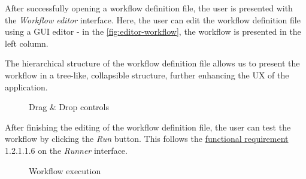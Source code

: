 After successfully opening a workflow definition file, the user is presented with the \textit{Workflow editor} interface. 
Here, the user can edit the workflow definition file using a \ac{GUI} editor - in the \autoref{fig:editor-workflow}, the workflow is presented in the left column.

The hierarchical structure of the workflow definition file allows us to present the workflow in a tree-like, collapsible structure, further enhancing the \ac{UX} of the application.

\begin{figure}[h!]
    \begin{center}
    \end{center}
    \caption{Drag \& Drop controls}
\end{figure}

After finishing the editing of the workflow definition file, the user can test the workflow by clicking the \textit{Run} button.
This follows the \hyperref[requirements]{functional requirement} 1.2.1.1.6 on the \textit{Runner} interface.

\begin{figure}[h!]
    \begin{center}
    \end{center}
    \caption{Workflow execution} \label{fig:editor-run}
\end{figure}

